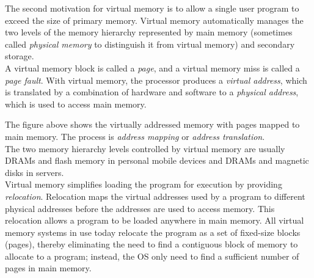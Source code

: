 \documentclass[12pt]{article}
\theoremstyle{definition}
\begin{document}
  The second motivation for virtual memory is to allow a single user program to exceed the size of primary memory.
  Virtual memory automatically manages the two levels of the memory hierarchy represented by main memory (sometimes called \emph{physical memory} to distinguish it from virtual memory) and secondary storage. \\

  A virtual memory block is called a \emph{page}, and a virtual memory miss is called a \emph{page fault}.
  With virtual memory, the processor produces a \emph{virtual address}, which is translated by a combination of hardware and software to a \emph{physical address}, which is used to access main memory.

  \begin{figure}[!htp]
  \end{figure}

  The figure above shows the virtually addressed memory with pages mapped to main memory.
  The process is \emph{address mapping} or \emph{address translation}. \\

  The two memory hierarchy levels controlled by virtual memory are usually DRAMs and flash memory in personal mobile devices and DRAMs and magnetic disks in servers. \\

  Virtual memory simplifies loading the program for execution by providing \emph{relocation}.
  Relocation maps the virtual addresses used by a program to different physical addresses before the addresses are used to access memory.
  This relocation allows a program to be loaded anywhere in main memory.
  All virtual memory systems in use today relocate the program as a set of fixed-size blocks (pages), thereby eliminating the need to find a contiguous block of memory to allocate to a program;
  instead, the OS only need to find a sufficient number of pages in main memory. \\
\end{document}

